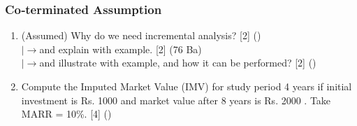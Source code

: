\documentclass[12pt]{article}
\newcommand{\lb}{\\ $\left|\rightarrow\right.$}
\begin{document}
		\subsubsection{Co‐terminated Assumption}
			\begin{enumerate}[noitemsep, topsep=0pt]
				\item (Assumed) Why do we need incremental analysis? \hfill [2] ()
				\lb and explain with example. \hfill [2] (76 Ba)
				\lb and illustrate with example, and how it can be performed? \hfill [2] ()

				\item Compute the Imputed Market Value (IMV) for study period 4 years if initial investment is Rs. 1000 and market value after 8 years is Rs. 2000 . Take MARR = 10\%. \hfill [4] ()
			\end{enumerate}
\end{document}

